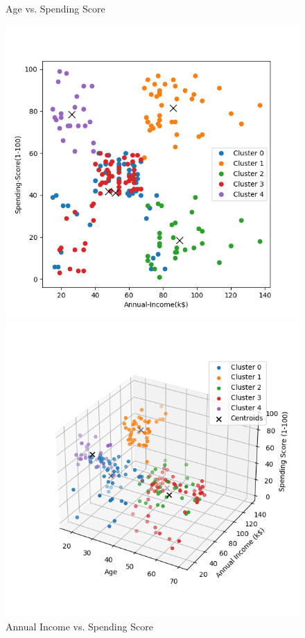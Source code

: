 \documentclass[8pt]{article}
\begin{document}
\begin{figure}[H]
\begin{minipage}{0.32\textwidth}
        \caption{Age vs. Spending Score}
        \label{fig: Age vs. Spending Score k5 rand14}
    \end{minipage}
    \hfill
    \begin{minipage}{0.32\textwidth}
        \centering
        \includegraphics[width=\textwidth]{./Prob4/out/task1_rand14/images/cluster_result_k5_1_2.png}
        \caption{Annual Income vs. Spending Score}
        \label{fig: Annual Income vs. Spending Score k5 rand14}
    \end{minipage}
    \hfill
    \begin{minipage}{0.32\textwidth}
        \centering
        \includegraphics[width=\textwidth]{./Prob4/out/task1_rand14/images/cluster_result_k5_3d.png}

\end{minipage}
\end{figure}
\end{document}
